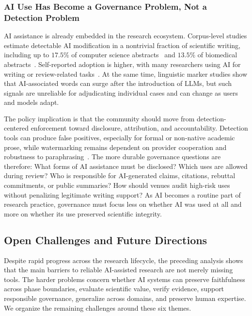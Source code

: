 \documentclass{llmxive}
\begin{document}
\subsubsection{AI Use Has Become a Governance Problem, Not a Detection Problem}
\label{sec:insight_governance}

AI assistance is already embedded in the research ecosystem. Corpus-level studies estimate detectable AI modification in a nontrivial fraction of scientific writing, including up to $17.5\%$ of computer science abstracts~\cite{liang2024mapping} and $13.5\%$ of biomedical abstracts~\cite{kobak2024delve}. Self-reported adoption is higher, with many researchers using AI for writing or review-related tasks~\cite{aireviewsurvey2025}. At the same time, linguistic marker studies show that AI-associated words can surge after the introduction of LLMs, but such signals are unreliable for adjudicating individual cases and can change as users and models adapt.

The policy implication is that the community should move from detection-centered enforcement toward disclosure, attribution, and accountability. Detection tools can produce false positives, especially for formal or non-native academic prose, while watermarking remains dependent on provider cooperation and robustness to paraphrasing~\cite{watermarking2025}. The more durable governance questions are therefore: What forms of AI assistance must be disclosed? Which uses are allowed during review? Who is responsible for AI-generated claims, citations, rebuttal commitments, or public summaries? How should venues audit high-risk uses without penalizing legitimate writing support? As AI becomes a routine part of research practice, governance must focus less on whether AI was used at all and more on whether its use preserved scientific integrity.



\subsection{Open Challenges and Future Directions}
\label{sec:open_challenges}

Despite rapid progress across the research lifecycle, the preceding analysis shows that the main barriers to reliable AI-assisted research are not merely missing tools. The harder problems concern whether AI systems can preserve faithfulness across phase boundaries, evaluate scientific value, verify evidence, support responsible governance, generalize across domains, and preserve human expertise. We organize the remaining challenges around these six themes.
\end{document}
